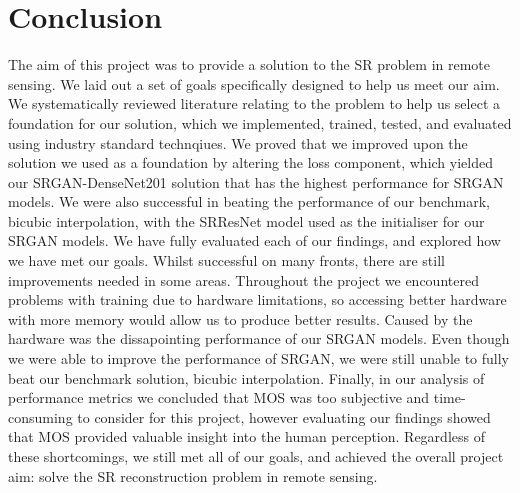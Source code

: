 \section{Conclusion}
The aim of this project was to provide a solution to the SR problem in remote sensing. We laid out a set of goals specifically designed to help us meet our aim. We systematically reviewed literature relating to the problem to help us select a foundation for our solution, which we implemented, trained, tested, and evaluated using industry standard technqiues. We proved that we improved upon the solution we used as a foundation by altering the loss component, which yielded our SRGAN-DenseNet201 solution that has the highest performance for SRGAN models. We were also successful in beating the performance of our benchmark, bicubic interpolation, with the SRResNet model used as the initialiser for our SRGAN models. We have fully evaluated each of our findings, and explored how we have met our goals. Whilst successful on many fronts, there are still improvements needed in some areas. Throughout the project we encountered problems with training due to hardware limitations, so accessing better hardware with more memory would allow us to produce better results. Caused by the hardware was the dissapointing performance of our SRGAN models. Even though we were able to improve the performance of SRGAN, we were still unable to fully beat our benchmark solution, bicubic interpolation. Finally, in our analysis of performance metrics we concluded that MOS was too subjective and time-consuming to consider for this project, however evaluating our findings showed that MOS provided valuable insight into the human perception. Regardless of these shortcomings, we still met all of our goals, and achieved the overall project aim: solve the SR reconstruction problem in remote sensing.

